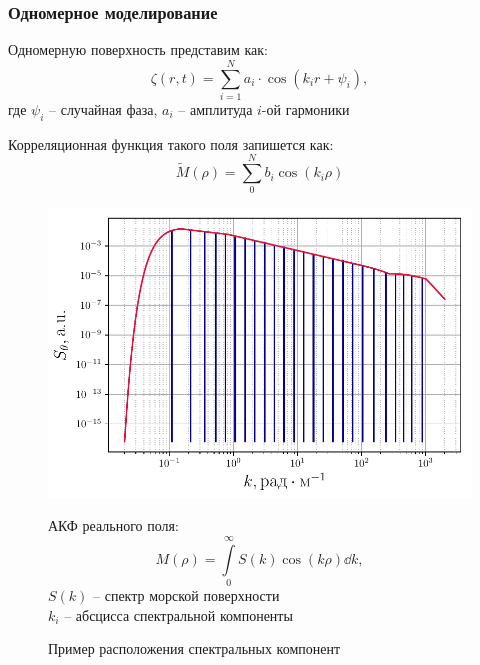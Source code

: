 \documentclass[10pt,pdf,hyperref={unicode}, dvipsnames]{beamer}
\newcommand{\tM}{\widetilde{M}}
\begin{document}
\begin{frame}[t]\frametitle{Одномерное моделирование}
\vskip -10pt
Одномерную поверхность представим как:
\begin{equation}
	\zeta(r, t)= \sum\limits_{i=1}^N a_i\cdot 
		\cos(k_ir + \psi_{i}),
\end{equation}
где $\psi_i$ -- случайная фаза, $a_i$ -- амплитуда $i$-ой гармоники

Корреляционная функция такого поля запишется как: 
    \begin{equation*}
    	\tM(\rho)=\sum\limits_0^{N} b_i \cos(k_i \rho)
    \end{equation*}


\vskip -12pt
\begin{figure}[H]
	\begin{minipage}{0.49\linewidth}
			\centering
			\includegraphics[width=\linewidth]{fig/split_angles}
			\caption{Пример расположения спектральных компонент}	
	\end{minipage}
	\hfill
	\begin{minipage}{0.49\linewidth}
		АКФ реального поля:
		\begin{equation}
			M(\rho)=\int\limits_0^{\infty} S(k)\cos(k \rho) \dd{k},
		\end{equation}
		$S(k)$ -- спектр морской поверхности \\
	    $k_i$ -- абсцисса спектральной компоненты
 
    	
	\end{minipage}
	\label{fig:splits}		
\end{figure}

\end{frame}
\end{document}
